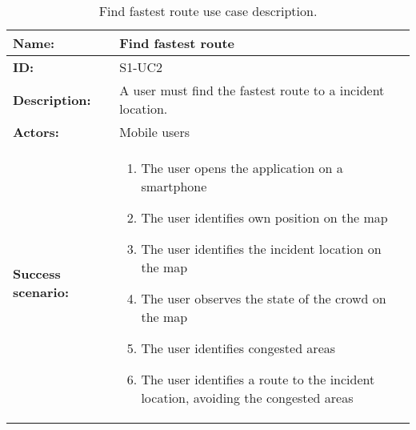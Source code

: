 \begin{table}[h!]
    \centering
    \begin{tabularx}{\textwidth}{l X}
        \toprule
        \textbf{Name:}  & Find fastest route \\ \midrule
        \textbf{ID:}    & S1-UC2\\ \midrule
        \textbf{Description:} & A user must find the fastest route to a incident location. \\ \midrule
        \textbf{Actors:} & Mobile users \\ \midrule
        \textbf{Success scenario:} & 
        \begin{enumerate}
            \item The user opens the application on a smartphone
            \item The user identifies own position on the map
            \item The user identifies the incident location on the map
            \item The user observes the state of the crowd on the map
            \item The user identifies congested areas
            \item The user identifies a route to the incident location, avoiding the congested areas
        \end{enumerate}
        \\
        \bottomrule
    \end{tabularx}
    \caption{Find fastest route use case description.}
    \label{tab:s1-uc2}
\end{table}